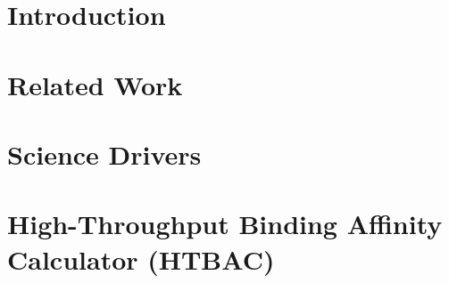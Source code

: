 \documentclass[conference]{IEEEtran}
\begin{document}

\section{Introduction}\label{sec:intro}



\section{Related Work}\label{sec:related-work}



\section{Science Drivers}\label{sec:science-drivers}



\section{High-Throughput Binding Affinity Calculator
(HTBAC)}\label{sec:htbac}


\vspace{-0.2in}

% 
\end{document}
